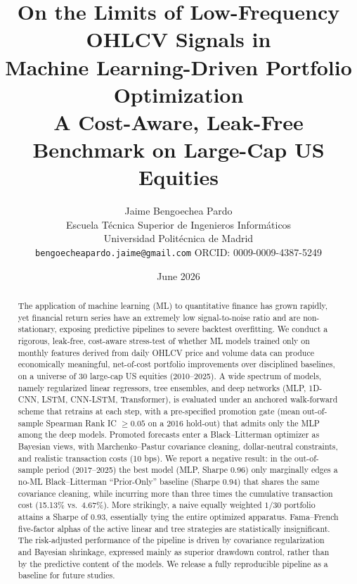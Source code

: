 \documentclass[11pt]{article}
\title{\textbf{On the Limits of Low-Frequency OHLCV Signals in\\
Machine Learning-Driven Portfolio Optimization}\\[0.4em]
\large A Cost-Aware, Leak-Free Benchmark on Large-Cap US Equities}
\author{Jaime Bengoechea Pardo\\
\small Escuela T\'ecnica Superior de Ingenieros Inform\'aticos\\
\small Universidad Polit\'ecnica de Madrid\\
\small \texttt{bengoecheapardo.jaime@gmail.com} \quad ORCID: 0009-0009-4387-5249}
\date{June 2026}
\begin{document}
\maketitle

\begin{abstract}
\noindent
The application of machine learning (ML) to quantitative finance has grown rapidly, yet
financial return series have an extremely low signal-to-noise ratio and are non-stationary,
exposing predictive pipelines to severe backtest overfitting. We conduct a rigorous, leak-free,
cost-aware stress-test of whether ML models trained only on monthly features derived from daily
OHLCV price and volume data can produce economically meaningful, net-of-cost portfolio
improvements over disciplined baselines, on a universe of 30 large-cap US equities (2010--2025).
A wide spectrum of models, namely regularized linear regressors, tree ensembles, and deep
networks (MLP, 1D-CNN, LSTM, CNN-LSTM, Transformer), is evaluated under an anchored
walk-forward scheme that retrains at each step, with a pre-specified promotion gate (mean
out-of-sample Spearman Rank IC $\ge 0.05$ on a 2016 hold-out) that admits only the MLP among the
deep models. Promoted forecasts enter a Black--Litterman optimizer as Bayesian views, with
Marchenko--Pastur covariance cleaning, dollar-neutral constraints, and realistic transaction
costs (10 bps). We report a negative result: in the out-of-sample period (2017--2025) the best
model (MLP, Sharpe 0.96) only marginally edges a no-ML Black--Litterman ``Prior-Only'' baseline
(Sharpe 0.94) that shares the same covariance cleaning, while incurring more than three times the
cumulative transaction cost (15.13\% vs.\ 4.67\%). More strikingly, a naive equally weighted
$1/30$ portfolio attains a Sharpe of 0.93, essentially tying the entire optimized apparatus.
Fama--French five-factor alphas of the active linear and tree strategies are statistically
insignificant. The risk-adjusted performance of the pipeline is driven by covariance
regularization and Bayesian shrinkage, expressed mainly as superior drawdown control, rather than
by the predictive content of the models. We release a fully reproducible pipeline as a baseline
for future studies.
\end{abstract}
\end{document}
